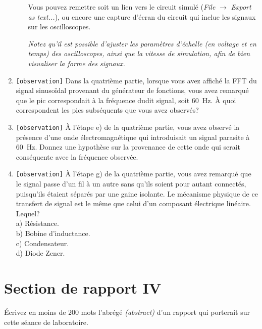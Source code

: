 \documentclass[canadien,12pt,oneside,letterpaper]{article}
\begin{document}
\begin{enumerate}
\begin{enumerate}
        Vous pouvez remettre soit un lien vers le circuit simulé (\textit{File} $\rightarrow$ \textit{Export as text...}), ou encore une capture d'écran du circuit qui inclue les signaux sur les oscilloscopes.\par
        \textit{Notez qu'il est possible d'ajuster les paramètres d'échelle (en voltage et en temps) des oscilloscopes, ainsi que la vitesse de simulation, afin de bien visualiser la forme des signaux.}
    \end{enumerate}   
    \item \texttt{[observation]} Dans la quatrième partie, lorsque vous avez affiché la FFT du signal sinusoïdal provenant du générateur de fonctions, vous avez remarqué que le pic correspondait à la fréquence dudit signal, soit 60~Hz. À quoi correspondent les pics subséquents que vous avez observés?
    \item \texttt{[observation]} À l'étape e) de la quatrième partie, vous avez observé la présence d'une onde électromagnétique qui introduisait un signal parasite à 60~Hz. Donnez une hypothèse sur la provenance de cette onde qui serait conséquente avec la fréquence observée.
    \item \texttt{[observation]} À l'étape g) de la quatrième partie, vous avez remarqué que le signal passe d'un fil à un autre sans qu'ils soient pour autant connectés, puisqu'ils étaient séparés par une gaine isolante. Le mécanisme physique de ce transfert de signal est le même que celui d'un composant électrique linéaire. Lequel?\\a) Résistance.\\b) Bobine d'inductance.\\c) Condensateur.\\d) Diode Zener.
\end{enumerate}

\section{Section de rapport IV}

Écrivez en moins de 200 mots l'abrégé \textit{(abstract)} d'un rapport qui porterait sur cette séance de laboratoire.
\end{document}
